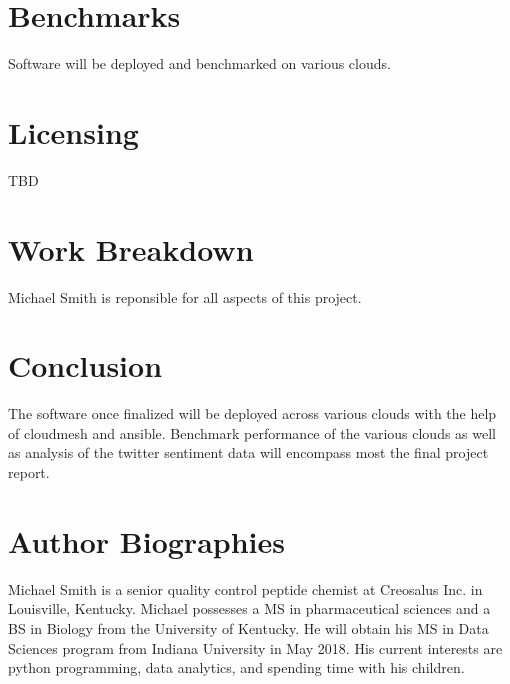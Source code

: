 \documentclass[9pt,twocolumn,twoside]{styles/osajnl}
\begin{document}
\section{Benchmarks}

Software will be deployed and benchmarked on various clouds.

\section{Licensing}

TBD

\section{Work Breakdown}

Michael Smith is reponsible for all aspects of this project.

\section{Conclusion}

The software once finalized will be deployed across various clouds with the help of cloudmesh and ansible.  Benchmark performance of the various clouds as well as analysis of the twitter sentiment data will encompass most the final project report.

\section{Author Biographies}

Michael Smith is a senior quality control peptide chemist at Creosalus Inc. in Louisville, Kentucky.  Michael possesses a MS in pharmaceutical sciences and a BS in Biology from the University of Kentucky.  He will obtain his MS in Data Sciences program from Indiana University in May 2018.  His current interests are python programming, data analytics, and spending time with his children.




\end{document}
